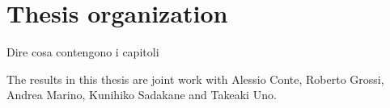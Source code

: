 



\section{Thesis organization}

Dire cosa contengono i capitoli

The results in this thesis are joint work with Alessio Conte, Roberto Grossi, Andrea Marino, Kunihiko Sadakane and Takeaki Uno.